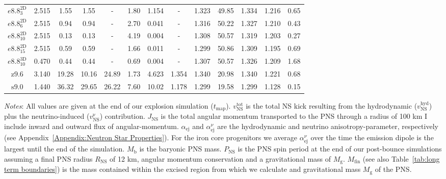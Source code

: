 \documentclass[fleqn,usenatbib]{mnras}
\newcommand{\snine}{\ensuremath{\mathrm{s9.0}}\xspace}
\newcommand{\znine}{\ensuremath{\mathrm{z9.6}}\xspace}
\newcommand{\GEO}[1]{{\color{red}#1}}
\newcommand{\COM}[1]{{\color{orange}#1}}
\begin{document}
\begin{table}
\begin{tabular}{cccccccccc||ccc}
    \hline
    $e8.8_{3}^{\mathrm{2D}}$ & 2.515 & 1.55  & 1.55  & -     & 1.80  & 1.154 &  -     & 1.323 &  49.85 &  1.334 &  1.216 &  0.65 \\
    $e8.8_{6}^{\mathrm{2D}}$ & 2.515 & 0.94  & 0.94  & -     & 2.70  & 0.041 &  -     & 1.316 &  50.22 &  1.327 &  1.210 &  0.43 \\
    $e8.8_{10}^{\mathrm{2D}}$& 2.515 & 0.13  & 0.13  & -     & 4.19  & 0.004 &  -     & 1.308 &  50.57 &  1.319 &  1.203 &  0.27 \\
    $e8.8_{15}^{\mathrm{2D}}$& 2.515 & 0.59  & 0.59  & -     & 1.66  & 0.011 &  -     & 1.299 &  50.86 &  1.309 &  1.195 &  0.69 \\
    $e8.8_{10}^{\mathrm{3D}}$& 0.470 & 0.44  & 0.44  & -     & 0.69  & 0.004 &  -     & 1.307 &  50.57 &  1.326 &  1.209 &  1.68  \\
    \znine                   & 3.140 & 19.28 & 10.16 & 24.89 & 1.73  & 4.623 & 1.354  & 1.340 &  20.98 &  1.340 &  1.221 &  0.68 \\
    \snine                   & 1.440 & 36.32 & 29.65 & 26.22 & 7.60  & 10.02 & 1.178  & 1.299 &  19.58 &  1.299 &  1.128 &  0.15  \\
    \hline
\end{tabular}
\flushleft
\textit{Notes}: \GEO{All values are given at the end of our explosion simulation ($t_{\mathrm{map}}$). $v_{\mathrm{NS}}^{\mathrm{tot}}$ is the total NS kick resulting from the hydrodynamic ($v_{\mathrm{NS}}^{\mathrm{hyd}}$) plus the neutrino-induced ($v_{\mathrm{NS}}^{\mathrm{\nu}}$) contribution. $J_{\mathrm{NS}}$ is the total angular momentum transported to the PNS through a radius of 100 km \COM{I include inward and outward flux of angular-momentum}. $\alpha_{\mathrm{ej}}$ and $\alpha_{\mathrm{ej}}^{\nu}$ are the hydrodynamic and neutrino anisotropy-parameter, respectively (see Appendix~\ref{Appendix:Neutron Star Properties}). For the iron core progenitors we average $\alpha_{\mathrm{ej}}^{\nu}$ over the time the emission dipole is the largest until the end of the simulation. $M_{\mathrm{b}}$ is the baryonic PNS mass. $P_{\mathrm{NS}}$ is the PNS spin period at the end of our post-bounce simulations assuming a final PNS radius $R_{\mathrm{NS}}$ of 12 km, angular momentum conservation and a gravitational mass of $M_{\mathrm{g}}$. $M_{\mathrm{fin}}$ (see also Table~\ref{tab:long term boundaries}) is the mass contained within the excised region from which we calculate and gravitational mass $M_{\mathrm{g}}$ of the PNS. }
\end{table}
\end{document}

